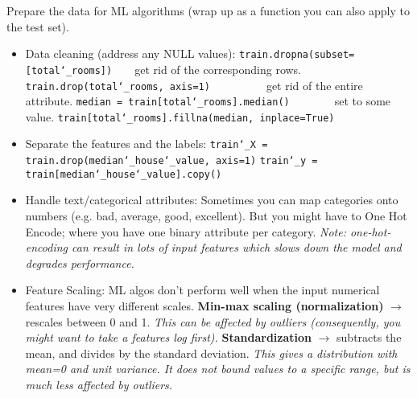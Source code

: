 Prepare the data for ML algorithms (wrap up as a function you can also apply to the test set).
\vspace{-3.0mm}
\begin{itemize}
\item
Data cleaning (address any NULL values):\newline
\texttt{train.dropna(subset=[\textquotesingle total\char`_rooms\textquotesingle])}~~~~get rid of the corresponding rows.\newline
\texttt{train.drop(\textquotesingle total\char`_rooms\textquotesingle, axis=1)}~~~~~~~~~~get rid of the entire attribute.\newline
\texttt{median = train[\textquotesingle total\char`_rooms\textquotesingle].median()}~~~~~~~~set to some value.\newline
\texttt{train[\textquotesingle total\char`_rooms\textquotesingle].fillna(median, inplace=True)}
\item
Separate the features and the labels:\newline
\texttt{train\char`_X = train.drop(\textquotesingle median\char`_house\char`_value\textquotesingle, axis=1)}\newline
\texttt{train\char`_y = train[\textquotesingle median\char`_house\char`_value\textquotesingle].copy()}
\item
Handle text/categorical attributes:\newline
Sometimes you can map categories onto numbers (e.g. bad, average, good, excellent).\newline
But you might have to One Hot Encode;
where you have one binary attribute per category.\newline
\textit{Note: one-hot-encoding can result in lots of input features
which slows down the model and degrades performance.}
\item
Feature Scaling:\newline
ML algos don't perform well when the input numerical features have very different scales.
\textbf{Min-max scaling (normalization)} $\rightarrow$ rescales between 0 and 1.\newline
\textit{This can be affected by outliers (consequently, you might want to take a features log first).}\newline
\textbf{Standardization} $\rightarrow$ subtracts the mean, and divides by the standard deviation.\newline
\textit{This gives a distribution with mean=0 and unit variance.
It does not bound values to a specific range,
but is much less affected by outliers.}\newline


\end{itemize}
